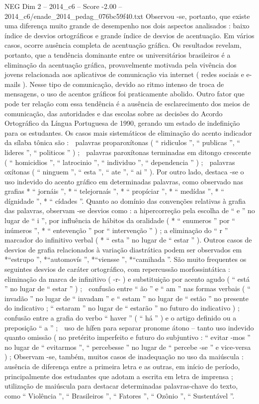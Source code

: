\begin{textsample}{NEG Dim 2 – 2014\_c6 – Score -2.00 – 2014\_c6/enade\_2014\_pedag\_076bc59f40.txt}
Observou -se, portanto, que existe uma diferença muito grande de desempenho nos dois aspectos analisados : baixo índice de desvios ortográficos e grande índice de desvios de acentuação.
Em vários casos, ocorre ausência completa de acentuação gráfica.
Os resultados revelam, portanto, que a tendência dominante entre os universitários brasileiros é a eliminação da acentuação gráfica, provavelmente motivada pela vivência dos jovens relacionada aos aplicativos de comunicação via internet ( redes sociais e e-mails ).
Nesse tipo de comunicação, devido ao ritmo intenso de troca de mensagens, o uso de acentos gráficos foi praticamente abolido.
Outro fator que pode ter relação com essa tendência é a ausência de esclarecimento dos meios de comunicação, das autoridades e das escolas sobre as decisões do Acordo Ortográfico da Língua Portuguesa de 1990, gerando um estado de indefinição para os estudantes.
Os casos mais sistemáticos de eliminação do acento indicador da sílaba tônica são :  palavras proparoxítonas ( “ ridiculos ”, “ publicas ”, “ lideres ”, “ politicos ” ) ;  palavras paroxítonas terminadas em ditongo crescente ( “ homicidios ”, “ latrocinio ”, “ individuo ”, “ dependencia ” ) ;  palavras oxítonas ( “ ninguem ”, “ esta ”, “ ate ”, “ ai ” ).
Por outro lado, destaca -se o uso indevido do acento gráfico em determinadas palavras, como observado nas grafias * “ jornáis ”, * “ telejornaís ”, * “ propíciar ”, * “ medídas ”, * “ dígnidade ”, * “ cídades ”.
Quanto ao domínio das convenções relativas à grafia das palavras, observam -se desvios como : a hipercorreção pela escolha de “ e ” no lugar de “ i ”, por influência de hábitos da oralidade ( * “ enumeros ” por “ inúmeros ”, * “ entevenção ” por “ intervenção ” ) ; a eliminação do “ r ” marcador do infinitivo verbal ( * “ esta ” no lugar de “ estar ” ).
Outros casos de desvios de grafia relacionados à variação diastrática podem ser observados em *“estrupo ”, *“automovís ”, *“viensse ”, *“camihada ”.
São muito frequentes os seguintes desvios de caráter ortográfico, com repercussão morfossintática :  eliminação da marca de infinitivo ( -r- ) e substituição por acento agudo ( “ está ” no lugar de “ estar ” ) ;  confusão entre “ ão ” e “ am ” nas formas verbais ( “ invadão ” no lugar de “ invadam ” e “ estam ” no lugar de “ estão ” no presente do indicativo ; “ estaram ” no lugar de “ estarão ” no futuro do indicativo ) ;  confusão entre a grafia do verbo “ haver ” ( “ há ” ) e o artigo definido ou a preposição “ a ” ;  uso de hífen para separar pronome átono – tanto uso indevido quanto omissão ( no pretérito imperfeito e futuro do subjuntivo : “ evitar -mos ” no lugar de “ evitarmos ”, “ percebesse ” no lugar de “ percebe -se ” e vice-versa ) ; Observam -se, também, muitos casos de inadequação no uso da maiúscula : ausência de diferença entre a primeira letra e as outras, em início de período, principalmente dos estudantes que adotam a escrita em letra de imprensa ; utilização de maiúscula para destacar determinadas palavras-chave do texto, como “ Violência ”, “ Brasileiros ”, “ Fatores ”, “ Ozônio ”, “ Sustentável ”.

\end{textsample}
